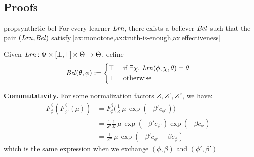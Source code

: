 \begin{subappendices}
    \clearpage
    \section{Proofs}

    \begin{linked}{prop}{synthetic-bel}
    	For every learner $\mathit{Lrn}$, there exists a 
    	believer $\mathit{Bel}$ such that the pair $(\mathit{Lrn}, \mathit{Bel})$ satisfy 
    	\cref{ax:monotone,ax:truth-is-enough,ax:effectiveness}
    \end{linked}
    \begin{lproof}\label{proof:synthetic-bel}
    	Given $\mathit{Lrn}: \Phi \times [\bot,\!\top] \times \Theta \to \Theta$,
    	define 
    	\[
    	\mathit{Bel}(\theta,\phi) := 
    	\begin{cases}
    		\top & \text{ if } \exists \chi.~\mathit{Lrn}(\phi,\chi,\theta) = \theta \\
    		\bot & \text{ otherwise } 
    	\end{cases}
    	\]
    \end{lproof}


    \begin{lproof}\label{proof:add-reparam}
        
    	
    \end{lproof}



    \begin{lproof}\label{proof:bolz-props}
    	\textbf{Commutativity.}
    	For some normalization factors $Z, Z', Z''$, we have:
    	\begin{align*}
    		 F^\beta_\phi( F^{\beta'}_{\phi'}(\mu))
    		 &= F^\beta_\phi \Big( \frac{1}{Z} \,\mu\, \exp(- \beta' c_{\phi'}) \Big) \\
    		 &= \frac{1}{Z'} \frac{1}{Z} \,\mu\, \exp(- \beta' c_{\phi'}) \exp(- \beta c_{\phi}) \\
    		 &= \frac{1}{Z''} \,\mu\, \exp(-\beta' c_{\phi'} - \beta c_\phi)
    	\end{align*}
    	which is the same expression when we exchange $(\phi, \beta)$ and $(\phi', \beta')$.
    \end{lproof}


\end{subappendices}
